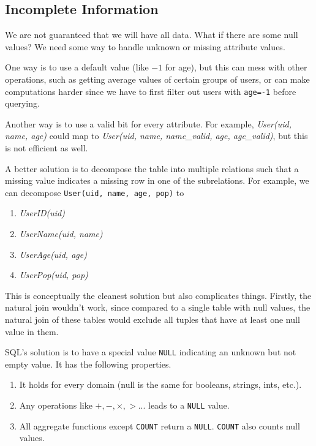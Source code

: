 \documentclass{article}
\begin{document}
  \subsection{Incomplete Information}

    We are not guaranteed that we will have all data. What if there are some null values? We need some way to handle unknown or missing attribute values. 

    One way is to use a default value (like $-1$ for age), but this can mess with other operations, such as getting average values of certain groups of users, or can make computations harder since we have to first filter out users with \texttt{age=-1} before querying. 

    Another way is to use a valid bit for every attribute. For example, \textit{User(uid, name, age)} could map to \textit{User(uid, name, name\_valid, age, age\_valid)}, but this is not efficient as well. 

    A better solution is to decompose the table into multiple relations such that a missing value indicates a missing row in one of the subrelations. For example, we can decompose \texttt{User(uid, name, age, pop)} to 
    \begin{enumerate}
      \item \textit{UserID(uid)}
      \item \textit{UserName(uid, name)}
      \item \textit{UserAge(uid, age)}
      \item \textit{UserPop(uid, pop)}
    \end{enumerate}
    This is conceptually the cleanest solution but also complicates things. Firstly, the natural join wouldn't work, since compared to a single table with null values, the natural join of these tables would exclude all tuples that have at least one null value in them. 


    \begin{definition}
      SQL's solution is to have a special value \texttt{NULL} indicating an unknown but not empty value. It has the following properties. 
      \begin{enumerate}
        \item It holds for every domain (null is the same for booleans, strings, ints, etc.). 
        \item Any operations like $+, -, \times, >$... leads to a \texttt{NULL} value. 
        \item All aggregate functions except \texttt{COUNT} return a \texttt{NULL}. \texttt{COUNT} also counts null values. 
      \end{enumerate}
    \end{definition}
\end{document}
